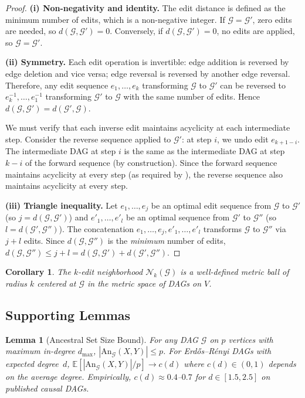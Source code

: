 \documentclass[11pt,a4paper]{article}
\newtheorem{lemma}[theorem]{Lemma}
\newtheorem{corollary}[theorem]{Corollary}
\theoremstyle{definition}
\theoremstyle{remark}
\newcommand{\DAG}{\mathcal{G}}
\newcommand{\An}{\mathrm{An}}
\newcommand{\editdist}{d}
\newcommand{\Nk}{\mathcal{N}_k}
\newcommand{\E}{\mathbb{E}}
\begin{document}
\begin{proof}
\textbf{(i) Non-negativity and identity.} The edit distance is defined as the minimum
number of edits, which is a non-negative integer. If $\DAG = \DAG'$, zero edits are
needed, so $\editdist(\DAG, \DAG') = 0$. Conversely, if $\editdist(\DAG, \DAG') = 0$,
no edits are applied, so $\DAG = \DAG'$.

\textbf{(ii) Symmetry.} Each edit operation is invertible: edge addition is reversed by
edge deletion and vice versa; edge reversal is reversed by another edge reversal.
Therefore, any edit sequence $e_1, \ldots, e_k$ transforming $\DAG$ to $\DAG'$ can be
reversed to $e_k^{-1}, \ldots, e_1^{-1}$ transforming $\DAG'$ to $\DAG$ with the same
number of edits. Hence $\editdist(\DAG, \DAG') = \editdist(\DAG', \DAG)$.

We must verify that each inverse edit maintains acyclicity at each intermediate step.
Consider the reverse sequence applied to $\DAG'$: at step $i$, we undo edit $e_{k+1-i}$.
The intermediate DAG at step $i$ is the same as the intermediate DAG at step $k - i$ of
the forward sequence (by construction). Since the forward sequence maintains acyclicity
at every step (as required by ), the reverse sequence also maintains
acyclicity at every step.

\textbf{(iii) Triangle inequality.} Let $e_1, \ldots, e_j$ be an optimal edit sequence
from $\DAG$ to $\DAG'$ (so $j = \editdist(\DAG, \DAG')$) and $e'_1, \ldots, e'_l$ be
an optimal sequence from $\DAG'$ to $\DAG''$ (so $l = \editdist(\DAG', \DAG'')$). The
concatenation $e_1, \ldots, e_j, e'_1, \ldots, e'_l$ transforms $\DAG$ to $\DAG''$ via
$j + l$ edits. Since $\editdist(\DAG, \DAG'')$ is the \emph{minimum} number of edits,
$\editdist(\DAG, \DAG'') \leq j + l = \editdist(\DAG, \DAG') + \editdist(\DAG', \DAG'')$.
\end{proof}

\begin{corollary}\label{cor:neighborhood}
The $k$-edit neighborhood $\Nk(\DAG)$ is a well-defined metric ball of radius $k$
centered at $\DAG$ in the metric space of DAGs on $V$.
\end{corollary}


\subsection{Supporting Lemmas}

\begin{lemma}[Ancestral Set Size Bound]\label{lem:ancestral_size}
For any DAG $\DAG$ on $p$ vertices with maximum in-degree $d_{\max}$,
$|\An_\DAG(X,Y)| \leq p$. For Erd\H{o}s--R\'enyi DAGs with expected degree~$d$,
$\E[|\An_\DAG(X,Y)|/p] \to c(d)$ where $c(d) \in (0,1)$ depends on the average
degree. Empirically, $c(d) \approx 0.4$--$0.7$ for $d \in [1.5, 2.5]$ on published
causal DAGs.
\end{lemma}
\end{document}
